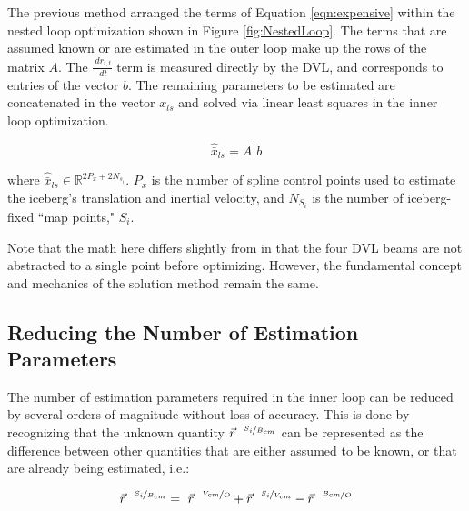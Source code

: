 The previous method arranged the terms of Equation \ref{eqn:expensive} within the nested loop optimization shown in Figure \ref{fig:NestedLoop}. The terms that are assumed known or are estimated in the outer loop make up the rows of the matrix $A$. The $\frac{~dr_{i,t}}{~dt}$ term is measured directly by the DVL, and corresponds to entries of the vector $b$. The remaining parameters to be estimated are concatenated in the vector $x_{ls}$ and solved via linear least squares in the inner loop optimization. 

\begin{equation}
    \hat{\bar{x}}_{ls} = A^{\dagger} b
    \label{eqn:LeastSquares}
\end{equation}

where $\hat{\bar{x}}_{ls}  \in \mathbb{R}^{ 2P_x + 2N_{s_i}}$. $P_x$ is the number of spline control points used to estimate the iceberg's translation and inertial velocity, and $N_{S_i}$ is the number of iceberg-fixed ``map points," $S_i$.


Note that the math here differs slightly from \cite{Kimball2011b} in that the four DVL beams are not abstracted to a single point before optimizing. However, the fundamental concept and mechanics of the solution method remain the same.



\subsection{Reducing the Number of Estimation Parameters}


The number of estimation parameters required in the inner loop can be reduced by several orders of magnitude without loss of accuracy. This is done by recognizing that the unknown quantity $\vec{r}^{~~\nicefrac{S_i}{B_{cm}}}$ can be represented as the difference between other quantities that are either assumed to be known, or that are already being estimated, i.e.:

\begin{equation}
    \label{eqn:SiSubstitution}
    \vec{r}^{~~\nicefrac{S_i}{B_{cm}}}  = ~\vec{r}^{~~\nicefrac{V_{cm}}{O}} + \vec{r}^{~~\nicefrac{S_i}{V_{cm}}} - \vec{r}^{~~\nicefrac{B_{cm}}{O}}
\end{equation}

